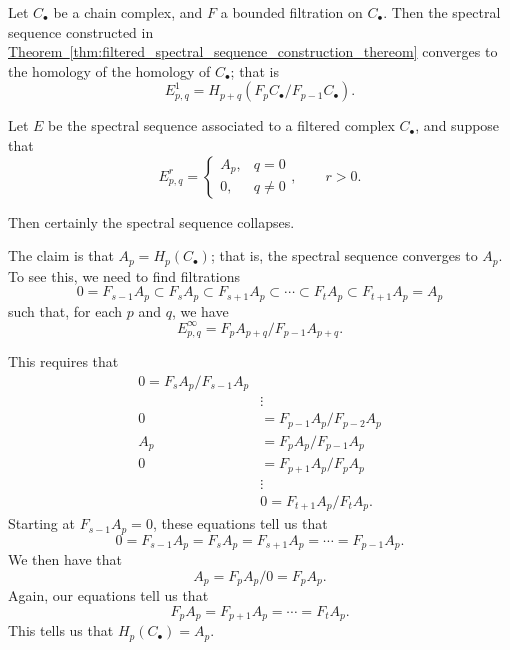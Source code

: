 \documentclass[main.tex]{subfiles}
\begin{document}
\begin{theorem}
  Let $C_{\bullet}$ be a chain complex, and $F$ a bounded filtration on $C_{\bullet}$. Then the spectral sequence constructed in \hyperref[thm:filtered_spectral_sequence_construction_thereom]{Theorem~\ref*{thm:filtered_spectral_sequence_construction_thereom}} converges to the homology of the homology of $C_{\bullet}$; that is
  \begin{equation*}
    E^{1}_{p,q} = H_{p+q}(F_{p}C_{\bullet}/F_{p-1}C_{\bullet}).
  \end{equation*}
\end{theorem}

\begin{example}
  Let $E$ be the spectral sequence associated to a filtered complex $C_{\bullet}$, and suppose that
  \begin{equation*}
    E^{r}_{p, q} =
    \begin{cases}
      A_{p}, &q = 0 \\
      0, &q \neq 0
    \end{cases},\qquad r > 0.
  \end{equation*}

  Then certainly the spectral sequence collapses.

  The claim is that $A_{p} = H_{p}(C_{\bullet})$; that is, the spectral sequence converges to $A_{p}$. To see this, we need to find filtrations
  \begin{equation*}
    0 = F_{s-1}A_{p} \subset F_{s}A_{p} \subset F_{s+1}A_{p} \subset \cdots \subset F_{t}A_{p} \subset F_{t+1}A_{p} = A_{p}
  \end{equation*}
  such that, for each $p$ and $q$, we have
  \begin{equation*}
    E^{\infty}_{p, q} = F_{p}A_{p+q}/F_{p-1}A_{p+q}.
  \end{equation*}

  This requires that
  \begin{align*}
    0 = F_{s}A_{p}/F_{s-1}A_{p} \\
    &\vdots \\
    0 &= F_{p-1}A_{p}/F_{p-2}A_{p} \\
    A_{p} &= F_{p}A_{p}/F_{p-1}A_{p} \\
    0 &= F_{p+1}A_{p}/F_{p}A_{p} \\
    &\vdots \\
    & 0 = F_{t+1}A_{p}/F_{t}A_{p}.
  \end{align*}
  Starting at $F_{s-1}A_{p} = 0$, these equations tell us that
  \begin{equation*}
    0 = F_{s-1}A_{p} = F_{s}A_{p} = F_{s+1}A_{p} = \cdots = F_{p-1}A_{p}.
  \end{equation*}
  We then have that
  \begin{equation*}
    A_{p} = F_{p}A_{p}/0 = F_{p}A_{p}.
  \end{equation*}
  Again, our equations tell us that
  \begin{equation*}
    F_{p}A_{p} = F_{p+1}A_{p} = \cdots = F_{t}A_{p}.
  \end{equation*}
  This tells us that $H_{p}(C_{\bullet}) = A_{p}$.


\end{example}
\end{document}
